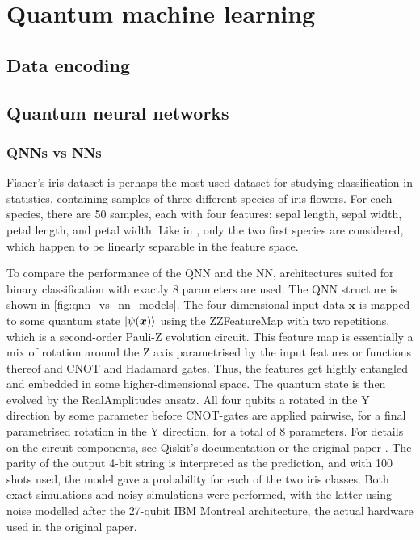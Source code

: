 \chapter{Quantum machine learning}

\section{Data encoding}

\section{Quantum neural networks}

\subsection{QNNs vs NNs}\label{sec:qnn-vs-nn}
Fisher's iris dataset is perhaps the most used dataset for studying classification in statistics, containing samples of three different species of iris flowers. For each species, there are 50 samples, each with four features: sepal length, sepal width, petal length, and petal width. Like in \cite{abbas2021}, only the two first species are considered, which happen to be linearly separable in the feature space.

To compare the performance of the QNN and the NN, architectures suited for binary classification with exactly 8 parameters are used. The QNN structure is shown in \cref{fig:qnn_vs_nn_models}. The four dimensional input data $\bm{x}$ is mapped to some quantum state $\ket{\psi(\bm{x})}$ using the ZZFeatureMap with two repetitions, which is a second-order Pauli-Z evolution circuit. This feature map is essentially a mix of rotation around the Z axis parametrised by the input features or functions thereof and CNOT and Hadamard gates. Thus, the features get highly entangled and embedded in some higher-dimensional space. The quantum state is then evolved by the RealAmplitudes ansatz. All four qubits a rotated in the Y direction by some parameter before CNOT-gates are applied pairwise, for a final parametrised rotation in the Y direction, for a total of 8 parameters. For details on the circuit components, see Qiskit's documentation \cite{qiskit} or the original paper \cite{abbas2021} . The parity of the output 4-bit string is interpreted as the prediction, and with 100 shots used, the model gave a probability for each of the two iris classes. Both exact simulations and noisy simulations were performed, with the latter using noise modelled after the 27-qubit IBM Montreal architecture, the actual hardware used in the original paper.

